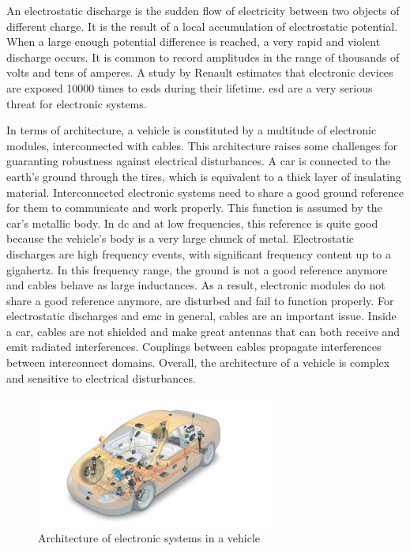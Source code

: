 An electrostatic discharge is the sudden flow of electricity between two objects of different charge.
It is the result of a local accumulation of electrostatic potential.
When a large enough potential difference is reached, a very rapid and violent discharge occurs.
It is common to record amplitudes in the range of thousands of volts and tens of amperes.
A study by Renault \cite{Renault-esd} estimates that electronic devices are exposed 10000 times to \gls{esd}s during their lifetime.
\gls{esd} are a very serious threat for electronic systems.

In terms of architecture, a vehicle is constituted by a multitude of electronic modules, interconnected with cables.
This architecture raises some challenges for guaranting robustness against electrical disturbances.
A car is connected to the earth's ground through the tires, which is equivalent to a thick layer of insulating material.
Interconnected electronic systems need to share a good ground reference for them to communicate and work properly.
This function is assumed by the car's metallic body.
In \gls{dc} and at low frequencies, this reference is quite good because the vehicle's body is a very large chunck of metal.
Electrostatic discharges are high frequency events, with significant frequency content up to a gigahertz.
In this frequency range, the ground is not a good reference anymore and cables behave as large inductances.
As a result, electronic modules do not share a good reference anymore, are disturbed and fail to function properly.
For electrostatic discharges and \gls{emc} in general, cables are an important issue.
Inside a car, cables are not shielded and make great antennas that can both receive and emit radiated interferences.
Couplings between cables propagate interferences between interconnect domains.
Overall, the architecture of a vehicle is complex and sensitive to electrical disturbances.

\begin{figure}[!h]
  \centering
  \includegraphics[width=0.7\textwidth]{src/1/figures/systemintegration_01_uv-data.jpg}
  \caption{Architecture of electronic systems in a vehicle \cite{car-architecture}}
  \label{fig:car-architecture}
\end{figure}

